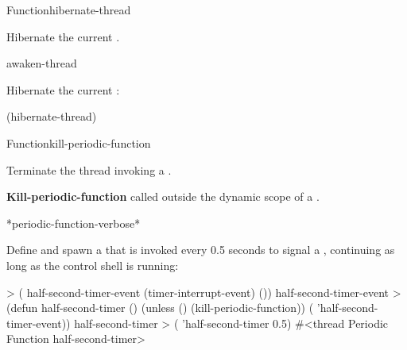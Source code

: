 
\begin{functiondoc}{Function}{hibernate-thread}{\noargs{}}
%

\fnsyntax

\fnpurpose Hibernate the current .

\fnpackage {}

\fnmodule {}

\fnerrors
\nothreads{}

\begin{alsos}{awaken-thread}
\end{alsos}

\fnexample
Hibernate the current :
\begin{example}
  (hibernate-thread)
\end{example}

\end{functiondoc}


\begin{functiondoc}{Function}{kill-periodic-function}{\noargs{}}
%
%

\fnsyntax

\fnpurpose Terminate the thread invoking a .

\fnpackage {}

\fnmodule {}

\fnerrors
\nothreads{}

\textbf{Kill-periodic-function} called outside the dynamic scope of a
.

\begin{alsos}{*periodic-function-verbose*}
\end{alsos}

%
%
%
%
\fnexample
Define and spawn a  that is invoked every 0.5 seconds
to signal a , continuing as long as the
control shell is running:
\begin{example}
> ( half-second-timer-event (timer-interrupt-event)
    ())
half-second-timer-event
> (defun half-second-timer ()
    (unless ()
      (kill-periodic-function))
    ( 'half-second-timer-event))
half-second-timer
> ( 'half-second-timer 0.5)
#<thread Periodic Function half-second-timer>
\end{example}

\end{functiondoc}

